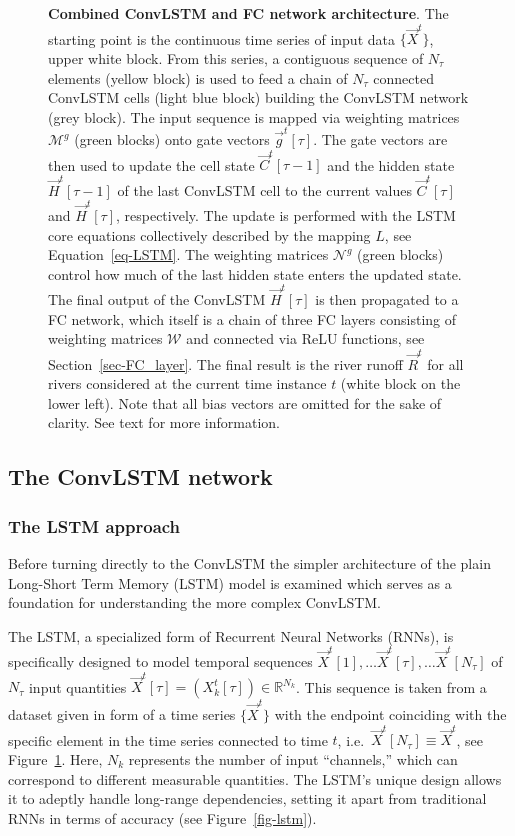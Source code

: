\documentclass[
]{agujournal2019}
\begin{document}
\begin{figure}
\caption{\label{fig-ConvLSTM_FC}\textbf{Combined ConvLSTM and FC network
architecture}. The starting point is the continuous time series of input
data \(\{\vec{X}^t\}\), upper white block. From this series, a
contiguous sequence of \(N_\tau\) elements (yellow block) is used to
feed a chain of \(N_\tau\) connected ConvLSTM cells (light blue block)
building the ConvLSTM network (grey block). The input sequence is mapped
via weighting matrices \(\pmb{\mathcal{M}}^g\) (green blocks) onto gate
vectors \(\vec{g}^t[\tau]\). The gate vectors are then used to update
the cell state \(\vec{C}^t[\tau-1]\) and the hidden state
\(\vec{H}^t[\tau-1]\) of the last ConvLSTM cell to the current values
\(\vec{C}^t[\tau]\) and \(\vec{H}^t[\tau]\), respectively. The update is
performed with the LSTM core equations collectively described by the
mapping \(L\), see Equation~\ref{eq-LSTM}. The weighting matrices
\(\pmb{\mathcal{N}}^g\) (green blocks) control how much of the last
hidden state enters the updated state. The final output of the ConvLSTM
\(\vec{H}^t[\tau]\) is then propagated to a FC network, which itself is
a chain of three FC layers consisting of weighting matrices
\(\pmb{\mathcal{W}}\) and connected via ReLU functions, see
Section~\ref{sec-FC_layer}. The final result is the river runoff
\(\vec{R}^t\) for all rivers considered at the current time instance
\(t\) (white block on the lower left). Note that all bias vectors are
omitted for the sake of clarity. See text for more information.}

\end{figure}%

\subsection{The ConvLSTM network}\label{the-convlstm-network}

\subsubsection{The LSTM approach}\label{sec-LSTM}

Before turning directly to the ConvLSTM the simpler architecture of the
plain Long-Short Term Memory (LSTM) model is examined which serves as a
foundation for understanding the more complex ConvLSTM.

The LSTM, a specialized form of Recurrent Neural Networks (RNNs), is
specifically designed to model temporal sequences
\(\vec{X}^t[1], \ldots \vec{X}^t[\tau],\ldots \vec{X}^t[N_\tau]\) of
\(N_\tau\) input quantities
\(\vec{X}^t[\tau] = (X^t_k[\tau]) \in \mathbb{R}^{N_k}\). This sequence
is taken from a dataset given in form of a time series \(\{\vec{X}^t\}\)
with the endpoint coinciding with the specific element in the time
series connected to time \(t\),
i.e.~\(\vec{X}^t[N_\tau] \equiv \vec{X}^t\), see
Figure~\ref{fig-ConvLSTM_FC}. Here, \(N_k\) represents the number of
input ``channels,'' which can correspond to different measurable
quantities. The LSTM's unique design allows it to adeptly handle
long-range dependencies, setting it apart from traditional RNNs in terms
of accuracy (see Figure~\ref{fig-lstm}).
\end{document}
